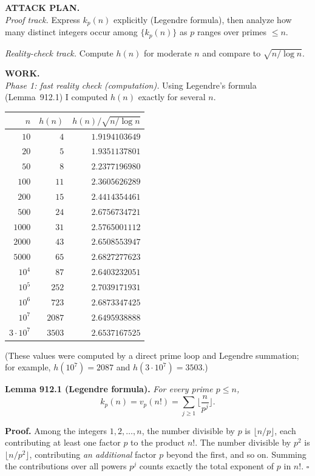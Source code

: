 \medskip
\noindent\textbf{ATTACK PLAN.}\\
\emph{Proof track.} Express $k_p(n)$ explicitly (Legendre formula), then analyze how many distinct integers occur among $\{k_p(n)\}$ as $p$ ranges over primes $\le n$.

\smallskip
\noindent\emph{Reality-check track.} Compute $h(n)$ for moderate $n$ and compare to $\sqrt{n/\log n}$.

\medskip
\noindent\textbf{WORK.}\\
\emph{Phase 1: fast reality check (computation).}  Using Legendre's formula (Lemma~912.1) I computed $h(n)$ exactly for several $n$.

\begin{center}
\begin{tabular}{r|r|r}
$n$ & $h(n)$ & $h(n)/\sqrt{n/\log n}$\\\hline
$10$ & $4$ & $1.9194103649$\\
$20$ & $5$ & $1.9351137801$\\
$50$ & $8$ & $2.2377196980$\\
$100$ & $11$ & $2.3605626289$\\
$200$ & $15$ & $2.4414354461$\\
$500$ & $24$ & $2.6756734721$\\
$1000$ & $31$ & $2.5765001112$\\
$2000$ & $43$ & $2.6508553947$\\
$5000$ & $65$ & $2.6827277623$\\
$10^4$ & $87$ & $2.6403232051$\\
$10^5$ & $252$ & $2.7039171931$\\
$10^6$ & $723$ & $2.6873347425$\\
$10^7$ & $2087$ & $2.6495938888$\\
$3\cdot 10^7$ & $3503$ & $2.6537167525$\\
\end{tabular}
\end{center}

\noindent (These values were computed by a direct prime loop and Legendre summation; for example, $h(10^7)=2087$ and $h(3\cdot 10^7)=3503$.)

\medskip
\noindent\textbf{Lemma 912.1 (Legendre formula).}  \emph{For every prime $p\le n$,}
\[
 k_p(n)=v_p(n!)=\sum_{j\ge 1} \Big\lfloor \frac{n}{p^j}\Big\rfloor.
\]

\noindent\textbf{Proof.} Among the integers $1,2,\dots,n$, the number divisible by $p$ is $\lfloor n/p\rfloor$, each contributing at least one factor $p$ to the product $n!$. The number divisible by $p^2$ is $\lfloor n/p^2\rfloor$, contributing \emph{an additional} factor $p$ beyond the first, and so on. Summing the contributions over all powers $p^j$ counts exactly the total exponent of $p$ in $n!$. \hfill$\square$

